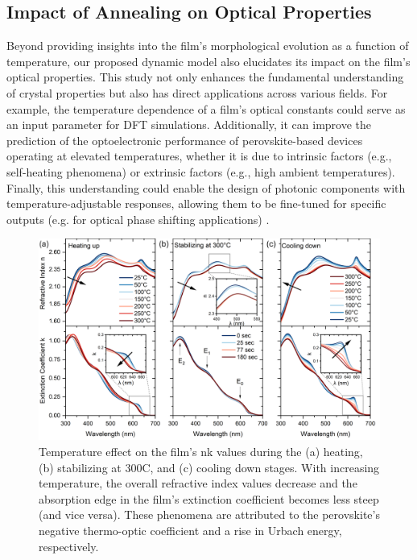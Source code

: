 \subsection{Impact of Annealing on Optical Properties}

Beyond providing insights into the film's morphological evolution as a function of temperature, our proposed dynamic model also elucidates its impact on the film’s optical properties. This study not only enhances the fundamental understanding of crystal properties but also has direct applications across various fields. For example, the temperature dependence of a film's optical constants could serve as an input parameter for DFT simulations. Additionally, it can improve the prediction of the optoelectronic performance of perovskite-based devices operating at elevated temperatures, whether it is due to intrinsic factors (e.g., self-heating phenomena) or extrinsic factors (e.g., high ambient temperatures). Finally, this understanding could enable the design of photonic components with temperature-adjustable responses, allowing them to be fine-tuned for specific outputs (e.g. for optical phase shifting applications) \cite{Handa2019LargePerovskite}.

\begin{figure}
  \centering
  \medskip
  \includegraphics[width=.99\textwidth]{chapters/ellipsometry/image/Optical Constants_labeled.png}
  \caption{Temperature effect on the  film's nk values during the (a) heating, (b) stabilizing at 300\degree C, and (c) cooling down stages. With increasing temperature, the overall refractive index values decrease and the absorption edge in the film's extinction coefficient becomes less steep (and vice versa). These phenomena are attributed to the perovskite's negative thermo-optic coefficient and a rise in Urbach energy, respectively.}
  \label{fig:ellipsometry:optical_constants}
\end{figure}


